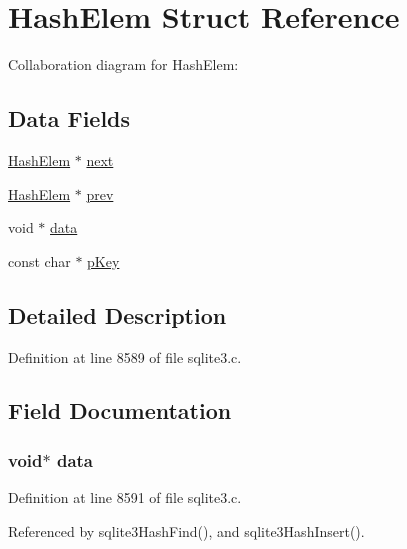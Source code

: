 \hypertarget{struct_hash_elem}{}\section{Hash\+Elem Struct Reference}
\label{struct_hash_elem}


Collaboration diagram for Hash\+Elem\+:
\subsection*{Data Fields}
\begin{DoxyCompactItemize}
\item 
\hyperlink{struct_hash_elem}{Hash\+Elem} $\ast$ \hyperlink{struct_hash_elem_a27ea4f910e02e974f759fe2080cd768b}{next}
\item 
\hyperlink{struct_hash_elem}{Hash\+Elem} $\ast$ \hyperlink{struct_hash_elem_aa233704aa1bbe094268fdedf929e8e52}{prev}
\item 
void $\ast$ \hyperlink{struct_hash_elem_a735984d41155bc1032e09bece8f8d66d}{data}
\item 
const char $\ast$ \hyperlink{struct_hash_elem_a9321d7fedcf35ceb8cfcded1209d13bf}{p\+Key}
\end{DoxyCompactItemize}


\subsection{Detailed Description}


Definition at line 8589 of file sqlite3.\+c.



\subsection{Field Documentation}
\hypertarget{struct_hash_elem_a735984d41155bc1032e09bece8f8d66d}{}
\subsubsection[{data}]{\setlength{\rightskip}{0pt plus 5cm}void$\ast$ data}\label{struct_hash_elem_a735984d41155bc1032e09bece8f8d66d}


Definition at line 8591 of file sqlite3.\+c.



Referenced by sqlite3\+Hash\+Find(), and sqlite3\+Hash\+Insert().

